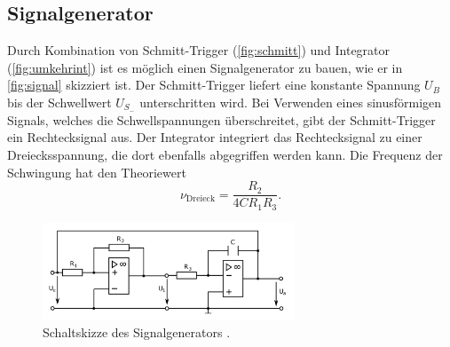 \subsection{Signalgenerator}
Durch Kombination von Schmitt-Trigger (\autoref{fig:schmitt}) und Integrator (\autoref{fig:umkehrint})
ist es möglich einen Signalgenerator zu bauen, wie er in \autoref{fig:signal} skizziert ist.
Der Schmitt-Trigger liefert eine konstante Spannung $U_B$ bis der Schwellwert $U_{S_{-}}$
unterschritten wird. Bei Verwenden eines sinusförmigen Signals, welches die Schwellspannungen überschreitet,
gibt der Schmitt-Trigger
ein Rechtecksignal aus. Der Integrator integriert das Rechtecksignal zu einer Dreiecksspannung, die dort
ebenfalls abgegriffen werden kann. Die Frequenz der Schwingung hat den Theoriewert\cite{anleitung}
\begin{equation}
    \nu_{\text{Dreieck}} = \frac{R_2}{4 C R_1 R_3}.
    \label{eq:dreieck}
\end{equation}
\begin{figure}[H]
    \centering
    \includegraphics[width=0.67\textwidth]{signalgenerator.png}
    \caption{Schaltskizze des Signalgenerators \cite{anleitung}.}
    \label{fig:signal}
\end{figure}

